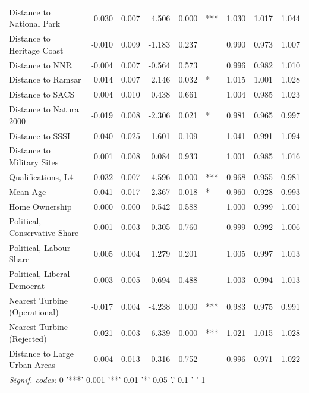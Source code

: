 \documentclass[a4paper,]{article}
\theoremstyle{definition}
\theoremstyle{definition}
\theoremstyle{definition}
\theoremstyle{remark}
\begin{document}
\begin{table}[!h]
{\begin{tabular}{lrrrrlrrr}
Distance to National Park & 0.030 & 0.007 & 4.506 & 0.000 & *** & 1.030 & 1.017 & 1.044\\
Distance to Heritage Coast & -0.010 & 0.009 & -1.183 & 0.237 &  & 0.990 & 0.973 & 1.007\\
Distance to NNR & -0.004 & 0.007 & -0.564 & 0.573 &  & 0.996 & 0.982 & 1.010\\
Distance to Ramsar & 0.014 & 0.007 & 2.146 & 0.032 & * & 1.015 & 1.001 & 1.028\\
Distance to SACS & 0.004 & 0.010 & 0.438 & 0.661 &  & 1.004 & 0.985 & 1.023\\
Distance to Natura 2000 & -0.019 & 0.008 & -2.306 & 0.021 & * & 0.981 & 0.965 & 0.997\\
Distance to SSSI & 0.040 & 0.025 & 1.601 & 0.109 &  & 1.041 & 0.991 & 1.094\\
Distance to Military Sites & 0.001 & 0.008 & 0.084 & 0.933 &  & 1.001 & 0.985 & 1.016\\
Qualifications, L4 & -0.032 & 0.007 & -4.596 & 0.000 & *** & 0.968 & 0.955 & 0.981\\
Mean Age & -0.041 & 0.017 & -2.367 & 0.018 & * & 0.960 & 0.928 & 0.993\\
Home Ownership & 0.000 & 0.000 & 0.542 & 0.588 &  & 1.000 & 0.999 & 1.001\\
Political, Conservative Share & -0.001 & 0.003 & -0.305 & 0.760 &  & 0.999 & 0.992 & 1.006\\
Political, Labour Share & 0.005 & 0.004 & 1.279 & 0.201 &  & 1.005 & 0.997 & 1.013\\
Political, Liberal Democrat & 0.003 & 0.005 & 0.694 & 0.488 &  & 1.003 & 0.994 & 1.013\\
Nearest Turbine (Operational) & -0.017 & 0.004 & -4.238 & 0.000 & *** & 0.983 & 0.975 & 0.991\\
Nearest Turbine (Rejected) & 0.021 & 0.003 & 6.339 & 0.000 & *** & 1.021 & 1.015 & 1.028\\
Distance to  Large Urban Areas & -0.004 & 0.013 & -0.316 & 0.752 &  & 0.996 & 0.971 & 1.022\\
\bottomrule
\multicolumn{9}{l}{\textit{Signif. codes: } 0 '***' 0.001 '**' 0.01 '*' 0.05 '.' 0.1 ' ' 1}\\
\end{tabular}}
\end{table}
\end{document}
